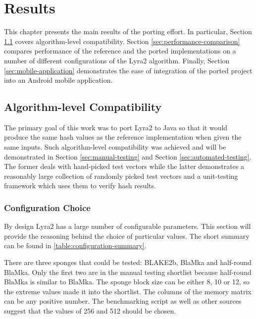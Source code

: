 \chapter{Results}
\label{sec:results}

This chapter presents the main results of the porting effort. In particular, Section \ref{sec:it-works} covers algorithm-level compatibility. Section \ref{sec:performance-comparison} compares performance of the reference and the ported implementations on a number of different configurations of the Lyra2 algorithm. Finally, Section \ref{sec:mobile-application} demonstrates the ease of integration of the ported project into an Android mobile application.

\section{Algorithm-level Compatibility}
\label{sec:it-works}

The primary goal of this work was to port Lyra2 to Java so that it would produce the same hash values as the reference implementation when given the same inputs. Such algorithm-level compatibility was achieved and will be demonstrated in Section \ref{sec:manual-testing} and Section \ref{sec:automated-testing}. The former deals with hand-picked test vectors while the latter demonstrates a reasonably large collection of randomly picked test vectors and a unit-testing framework which uses them to verify hash results.

\subsection{Configuration Choice}
By design Lyra2 has a large number of configurable parameters. This section will provide the reasoning behind the choice of particular values. The short summary can be found in \autoref{table:configuration-summary}.

There are three sponges that could be tested: BLAKE2b, BlaMka and half-round BlaMka. Only the first two are in the manual testing shortlist because half-round BlaMka is similar to BlaMka. The sponge block size can be either 8, 10 or 12, so the extreme values made it into the shortlist. The columns of the memory matrix can be any positive number. The  benchmarking script as well as other sources suggest that the values of 256 and 512 should be chosen.

